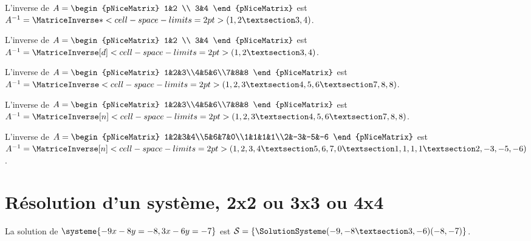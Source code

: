 \documentclass[french,a4paper,10pt]{article}
\begin{document}
\begin{ShowCodeTeX}
L'inverse de $A=\begin{pNiceMatrix} 1&2 \\ 3&4 \end{pNiceMatrix}$ est
$A^{-1}=\MatriceInverse*<cell-space-limits=2pt>(1,2 § 3,4)$.
\end{ShowCodeTeX}

\begin{ShowCodeTeX}
L'inverse de $A=\begin{pNiceMatrix} 1&2 \\ 3&4 \end{pNiceMatrix}$ est
$A^{-1}=\MatriceInverse[d]<cell-space-limits=2pt>(1,2 § 3,4)$.
\end{ShowCodeTeX}

\begin{ShowCodeTeX}
L'inverse de $A=\begin{pNiceMatrix} 1&2&3\\4&5&6\\7&8&8 \end{pNiceMatrix}$ est
$A^{-1}=\MatriceInverse<cell-space-limits=2pt>(1,2,3 § 4,5,6 § 7,8,8)$.
\end{ShowCodeTeX}

\begin{ShowCodeTeX}
L'inverse de $A=\begin{pNiceMatrix} 1&2&3\\4&5&6\\7&8&8 \end{pNiceMatrix}$ est
$A^{-1}=\MatriceInverse[n]<cell-space-limits=2pt>(1,2,3 § 4,5,6 § 7,8,8)$.
\end{ShowCodeTeX}

\begin{ShowCodeTeX}
L'inverse de $A=\begin{pNiceMatrix} 1&2&3&4\\5&6&7&0\\1&1&1&1\\2&-3&-5&-6 \end{pNiceMatrix}$
est $A^{-1}=\MatriceInverse[n]<cell-space-limits=2pt>(1,2,3,4 § 5,6,7,0 § 1,1,1,1 § 2,-3,-5,-6)$.
\end{ShowCodeTeX}

\section*{Résolution d'un système, 2x2 ou 3x3 ou 4x4}

\begin{ShowCodeTeX}
La solution de $\systeme{-9x-8y=-8,3x-6y=-7}$ est $\mathcal{S}=%
\left\lbrace \SolutionSysteme(-9,-8 § 3,-6)(-8,-7) \right\rbrace$.
\end{ShowCodeTeX}
\end{document}
